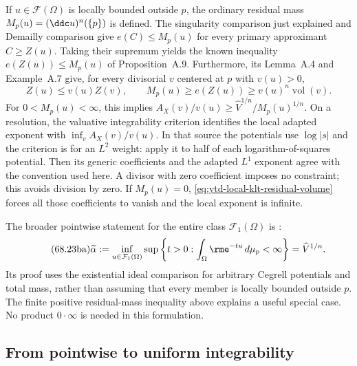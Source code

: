 If $u\in\mathcal F(\Omega)$ is locally bounded outside $p$, the
ordinary residual mass $M_p(u)=(\ddc u)^n(\{p\})$ is defined.
The singularity comparison just explained and Demailly comparison
give $e(C)\leq M_p(u)$ for every primary approximant $C\geq Z(u)$.
Taking their supremum yields the known inequality
$e(Z(u))\leq M_p(u)$ of Proposition~A.9.
Furthermore, its Lemma~A.4 and Example~A.7 give, for every
divisorial $v$ centered at $p$ with $v(u)>0$,
\[
\tag{68.23az}\label{eq:ytd-local-klt-residual-volume}
 Z(u)\leq v(u)Z(v),
 \qquad
 M_p(u)\geq e(Z(u))
           \geq v(u)^n\operatorname{vol}(v).
\]
For $0<M_p(u)<\infty$, this implies
$A_X(v)/v(u)\geq\widehat V^{1/n}/M_p(u)^{1/n}$.
On a resolution, the valuative integrability criterion
\cite[Theorem~B.5]{BBJ20IntegrabilityV3} identifies the local
adapted exponent with $\inf_v A_X(v)/v(u)$. In that source the
potentials use $\log|s|$ and the criterion is for an $L^2$ weight:
apply it to half of each logarithm-of-squares potential. Then its
generic coefficients and the adapted $L^1$ exponent agree with
the convention used here. A divisor with zero coefficient imposes
no constraint; this avoids division by zero. If $M_p(u)=0$,
\eqref{eq:ytd-local-klt-residual-volume} forces all those
coefficients to vanish and the local exponent is infinite.

The broader pointwise statement for the entire class
$\mathcal F_1(\Omega)$ is
\cite[Proposition~5.8]{GuedjTrusiani25LocalPublished}:
\[
\tag{68.23ba}\label{eq:ytd-local-klt-pointwise-alpha}
 \widetilde\alpha
 :=\inf_{u\in\mathcal F_1(\Omega)}
       \sup\left\{t>0:\int_\Omega\rme^{-tu}\,d\mu_p<\infty\right\}
 =\widehat V^{1/n}.
\]
Its proof uses the existential ideal comparison for arbitrary
Cegrell potentials and total mass, rather than assuming that
every member is locally bounded outside $p$. The finite positive
residual-mass inequality above explains a useful special case.
No product $0\cdot\infty$ is needed in this formulation.

\subsection{From pointwise to uniform integrability}
\label{sec:ytd-local-klt-uniform-alpha}

